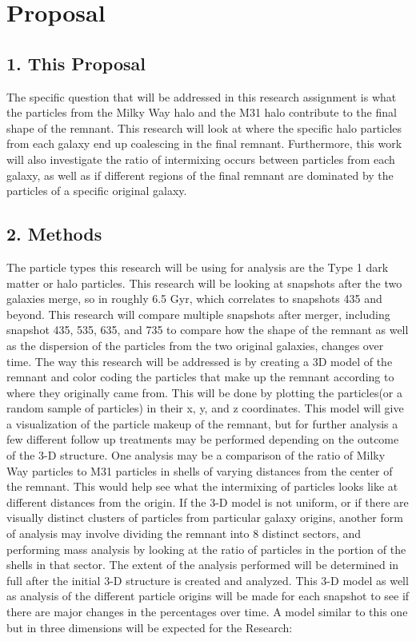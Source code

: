 \documentclass[linenumbers,trackchanges]{aastex7}
\begin{document}
\section{Proposal} \label{sec:style}

\subsection{1. This Proposal} \label{subsec:tables}
The specific question that will be addressed in this research assignment is what the particles from the Milky Way halo and the M31 halo contribute to the final shape of the remnant. This research will look at where the specific halo particles from each galaxy end up coalescing in the final remnant. Furthermore, this work will also investigate the ratio of intermixing occurs between particles from each galaxy, as well as if different regions of the final remnant are dominated by the particles of a specific original galaxy. 

\subsection{2. Methods} \label{subsec:tables}
The particle types this research will be using for analysis are the Type 1 dark matter or halo particles. This research will be looking at snapshots after the two galaxies merge, so in roughly 6.5 Gyr, which correlates to snapshots 435 and beyond. This research will compare multiple snapshots after merger, including snapshot 435, 535, 635, and 735 to compare how the shape of the remnant as well as the dispersion of the particles from the two original galaxies, changes over time. The way this research will be addressed is by creating a 3D model of the remnant and color coding the particles that make up the remnant according to where they originally came from. This will be done by plotting the particles(or a random sample of particles) in their x, y, and z coordinates. This model will give a visualization of the particle makeup of the remnant, but for further analysis a few different follow up treatments may be performed depending on the outcome of the 3-D structure. One analysis may be a comparison of the ratio of Milky Way particles to M31 particles in shells of varying distances from the center of the remnant. This would help see what the intermixing of particles looks like at different distances from the origin. If the 3-D model is not uniform, or if there are visually distinct clusters of particles from particular galaxy origins, another form of analysis may involve dividing the remnant into 8 distinct sectors, and performing mass analysis by looking at the ratio of particles in the portion of the shells in that sector. The extent of the analysis performed will be determined in full after the initial 3-D structure is created and analyzed. This 3-D model as well as analysis of the different particle origins will be made for each snapshot to see if there are major changes in the percentages over time.  
A model similar to this one but in three dimensions will be expected for the Research:
\cite{2019MNRAS.487..993D}
\end{document}
